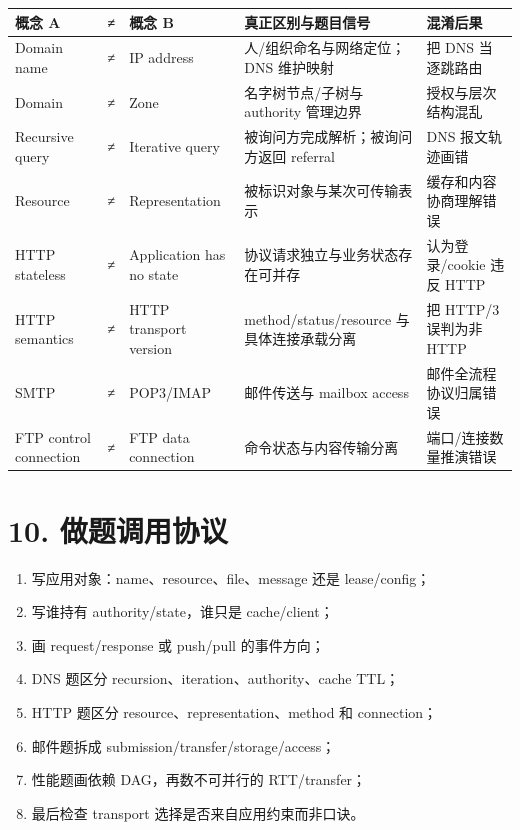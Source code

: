 \documentclass[UTF8,fontset=none,11pt,a4paper]{ctexart}
\providecommand{\tightlist}{\setlength{\itemsep}{0pt}\setlength{\parskip}{0pt}}
\begin{document}
\begin{longtable}[]{@{}lclll@{}}
\toprule\noalign{}
概念 A & ≠ & 概念 B & 真正区别与题目信号 & 混淆后果 \\
\midrule\noalign{}
\endhead
\bottomrule\noalign{}
\endlastfoot
Domain name & ≠ & IP address & 人/组织命名与网络定位；DNS 维护映射 & 把
DNS 当逐跳路由 \\
Domain & ≠ & Zone & 名字树节点/子树与 authority 管理边界 &
授权与层次结构混乱 \\
Recursive query & ≠ & Iterative query & 被询问方完成解析；被询问方返回
referral & DNS 报文轨迹画错 \\
Resource & ≠ & Representation & 被标识对象与某次可传输表示 &
缓存和内容协商理解错误 \\
HTTP stateless & ≠ & Application has no state &
协议请求独立与业务状态存在可并存 & 认为登录/cookie 违反 HTTP \\
HTTP semantics & ≠ & HTTP transport version & method/status/resource
与具体连接承载分离 & 把 HTTP/3 误判为非 HTTP \\
SMTP & ≠ & POP3/IMAP & 邮件传送与 mailbox access &
邮件全流程协议归属错误 \\
FTP control connection & ≠ & FTP data connection &
命令状态与内容传输分离 & 端口/连接数量推演错误 \\
\end{longtable}

\section{10.
做题调用协议}\label{10-ux505aux9898ux8c03ux7528ux534fux8bae}

\begin{enumerate}
\def\labelenumi{\arabic{enumi}.}
\tightlist
\item
  写应用对象：name、resource、file、message 还是 lease/config；
\item
  写谁持有 authority/state，谁只是 cache/client；
\item
  画 request/response 或 push/pull 的事件方向；
\item
  DNS 题区分 recursion、iteration、authority、cache TTL；
\item
  HTTP 题区分 resource、representation、method 和 connection；
\item
  邮件题拆成 submission/transfer/storage/access；
\item
  性能题画依赖 DAG，再数不可并行的 RTT/transfer；
\item
  最后检查 transport 选择是否来自应用约束而非口诀。
\end{enumerate}
\end{document}
